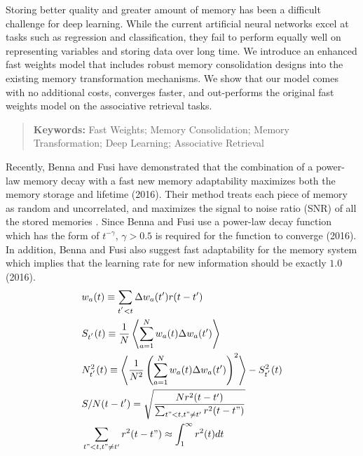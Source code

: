 \documentclass[portrait,a0b,final,a4resizeable]{include/a0poster}
\begin{document}
\begin{poster}
\vspace*{2.5cm}

\large




\begin{multicols}{3}
% 
%
% 
\vspace{0.2in}
% 
{
\Large\sffamily
Storing better quality and greater amount of memory has been a difficult challenge for deep learning.
While the current artificial neural networks excel at tasks such as regression and classification, they fail to perform equally well on representing variables and storing data over long time.
We introduce an enhanced fast weights model that includes robust memory consolidation designs into the existing memory transformation mechanisms.
We show that our model comes with no additional costs, converges faster, and out-performs the original fast weights model on the associative retrieval tasks.
}
\begin{quote}
\vspace{0.2in}
\textbf{Keywords:} 
Fast Weights; Memory Consolidation; Memory Transformation; Deep Learning; Associative Retrieval
\end{quote}

\vspace{0.5in}

%
Recently, Benna and Fusi have demonstrated that the combination of a power-law memory decay with a fast new memory adaptability maximizes both the memory storage and lifetime (2016).
Their method treats each piece of memory as random and uncorrelated, and maximizes the signal to noise ratio (SNR) of all the stored memories \cite{pld}.
Since Benna and Fusi use a power-law decay function which has the form of \emph{$t^{-\gamma}$}, $\gamma > 0.5$ is required for the function to converge (2016).
In addition, Benna and Fusi also suggest fast adaptability for the memory system which implies that the learning rate for new information should be exactly $1.0$ (2016).
% 
\vspace{0.25in}
\begin{align}
    &w_a(t) \equiv \sum_{t^{'} < t} \Delta w_a(t') r(t-t')
    \label{eq:memory} \\
    &S_{t^{'}}(t) \equiv \frac{1}{N}\left<\sum_{a=1}^N w_a(t)\Delta w_a(t') \right>
    \label{eq:signal} \\
    &N^2_{t^{'}}(t) \equiv \left<\frac{1}{N^2}\left(\sum_{a=1}^N w_a(t)\Delta w_a(t') \right)^2 \right> - S^2_{t^{'}}(t)
    \label{eq:variance} \\
    &S / N(t - t') = \sqrt{\frac{N r^2(t - t')}{\sum_{t" < t, t" \neq t'} r^2(t- t")}}
    \label{eq:snr}\\
    &\sum_{t" < t, t" \neq t'} r^2(t- t") \approx \int_{1}^{\infty} r^2(t) dt 
    \label{eq:decay}
\end{align}
\vspace{0.25in}


\end{multicols}
\end{poster}
\end{document}
